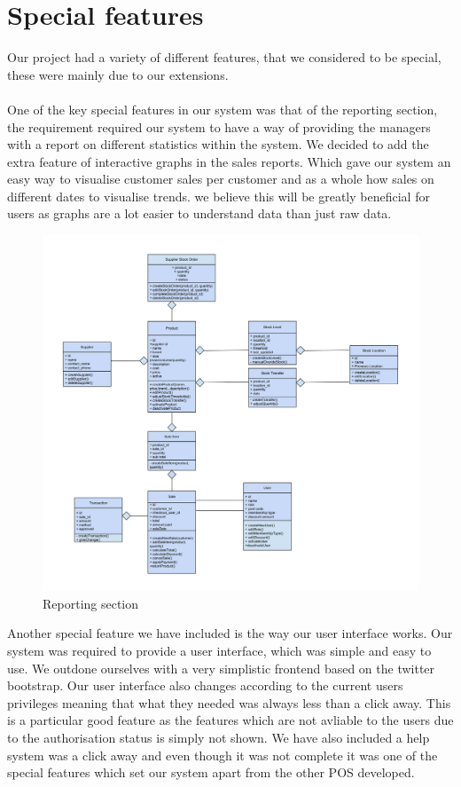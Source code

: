 \documentclass[a4paper]{article}
\begin{document}
\pagebreak
\section{Special features}
Our project had a variety of different features, that we considered to be special, these were mainly due to our extensions. 
\\\\
One of the key special features in our system was that of the reporting section, the requirement required our system to have a way of providing the managers with a report on different statistics within the system. We decided to add the extra feature of interactive graphs in the sales reports. Which gave our system an easy way to visualise customer sales per customer and as a whole how sales on different dates  to visualise trends. we believe this will be greatly beneficial for users as graphs are a lot easier to understand data than just raw data. 

\begin{figure}[h]
\centering
  \includegraphics[scale=0.01]{Class diagram.png}
	\caption{Reporting section}
\end{figure}

Another special feature we have included is the way our user interface works. Our system was required to provide a user interface, which was simple and easy to use. We outdone ourselves  with a very simplistic frontend based on the twitter bootstrap. Our user interface also changes according to the current users privileges meaning that what they needed was always less than a click away. This is a particular good feature as the features which are not avliable to the users due to the authorisation status is simply not shown. We have also included a help system was a click away and even though it was not complete it was one of the special features which set our system apart from the other POS developed.
\end{document}
